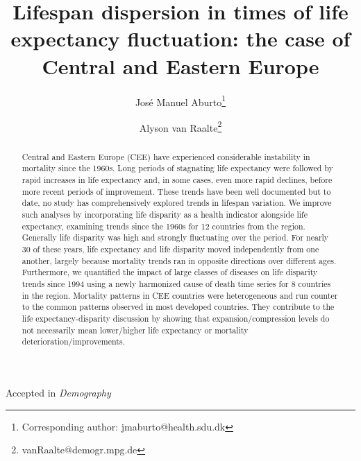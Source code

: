 \documentclass{article}
\title{Lifespan dispersion in times of life expectancy fluctuation: the case of Central and Eastern Europe}
\author[1,2]{Jos\'e Manuel Aburto\thanks{Corresponding author: jmaburto@health.sdu.dk}}
\author[2]{Alyson van Raalte\thanks{vanRaalte@demogr.mpg.de}}
\affil[1]{Interdisciplinary Center for Research and Education on Population Change, Department of Public Health, University of Southern Denmark}
\affil[2]{Max Planck Institute for Demographic Research}
\date{}
\begin{document}
\maketitle
\begin{center}Accepted in \emph{Demography} \end{center}

\begin{abstract}
Central and Eastern Europe (CEE) have experienced considerable instability in mortality since the 1960s. Long periods of stagnating life expectancy were followed by rapid increases in life expectancy and, in some cases, even more rapid declines, before more recent periods of improvement. These trends have been well documented but to date, no study has comprehensively explored trends in lifespan variation.  We improve such analyses by incorporating life disparity as a health indicator alongside life expectancy, examining trends since the 1960s for 12 countries from the region. Generally life disparity was high and strongly fluctuating over the period. For nearly 30 of these years, life expectancy and life disparity moved independently from one another, largely because mortality trends ran in opposite directions over different ages. Furthermore, we quantified the impact of large classes of diseases on life disparity trends since 1994 using a newly harmonized cause of death time series for 8 countries in the region. Mortality patterns in CEE countries were heterogeneous and run counter to the common patterns observed in most developed countries. They contribute to the life expectancy-disparity discussion by showing that expansion/compression levels do not necessarily mean lower/higher life expectancy or mortality deterioration/improvements.
\end{abstract}


\newpage
\end{document}
